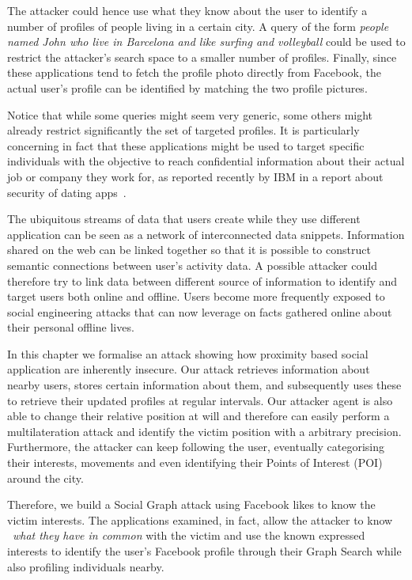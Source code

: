 The attacker could hence use what they know about the user to identify a number of profiles of people living in a certain city. A query of the form \emph{people named John who live in Barcelona and like surfing and volleyball} could be used to restrict the attacker's search space to a smaller number of profiles. Finally, since these applications tend to fetch the profile photo directly from Facebook, the actual user's profile can be identified by matching the two profile pictures.

Notice that while some queries might seem very generic, some others might already restrict significantly the set of targeted profiles. It is particularly concerning in fact that these applications might be used to target specific individuals with the objective to reach confidential information about their actual job or company they work for, as reported recently by IBM in a report about security of dating apps~\cite{ibm2015report}.

The ubiquitous streams of data that users create while they use different application can be seen as a network of interconnected data snippets. Information shared on the web can be linked together so that it is possible to construct semantic connections between user's activity data. A possible attacker could therefore try to link data between different source of information to identify and target users both online and offline. Users become more frequently exposed to social engineering attacks that can now leverage on facts gathered online about their personal offline lives.

In this chapter we formalise an attack showing how proximity based social application are inherently insecure. Our attack retrieves information about nearby users, stores certain information about them, and subsequently uses these to retrieve their updated profiles at regular intervals. Our attacker agent is also able to change their relative position at will and therefore can easily perform a multilateration attack and identify the victim position with a arbitrary precision. Furthermore, the attacker can keep following the user, eventually categorising their interests, movements and even identifying their Points of Interest (POI) around the city.

Therefore, we build a Social Graph attack using Facebook likes to know the victim interests. The applications examined, in fact, allow the attacker to know ~\emph{what they have in common} with the victim and use the known expressed interests to identify the user's Facebook profile through their Graph Search while also profiling individuals nearby.

